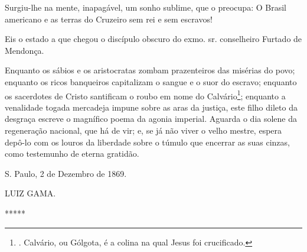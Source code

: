 Surgiu-lhe na mente, inapagável, um sonho sublime, que o preocupa: O
Brasil americano e as terras do Cruzeiro sem rei e sem escravos!

Eis o estado a que chegou o discípulo obscuro do exmo. sr. conselheiro
Furtado de Mendonça.

Enquanto os sábios e os aristocratas zombam prazenteiros das misérias do
povo; enquanto os ricos banqueiros capitalizam o sangue e o suor do
escravo; enquanto os sacerdotes de Cristo santificam o roubo em nome do
Calvário\footnote{. Calvário, ou Gólgota, é a colina na qual Jesus foi
  crucificado.}; enquanto a venalidade togada mercadeja impune sobre as
aras da justiça, este filho dileto da desgraça escreve o magnífico poema
da agonia imperial. Aguarda o dia solene da regeneração nacional, que há
de vir; e, se já não viver o velho mestre, espera depô-lo com os louros
da liberdade sobre o túmulo que encerrar as suas cinzas, como testemunho
de eterna gratidão.

S. Paulo, 2 de Dezembro de 1869.

LUIZ GAMA.

*****
